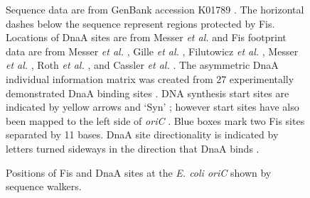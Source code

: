 \documentclass[doublespacing]{narfront}
\begin{document}
\begin{figure}[ht]
\caption{Positions of Fis and DnaA sites at the \emph{E. coli oriC}
shown by sequence walkers.}
Sequence data are from GenBank accession K01789
\cite{Messer.Schaller1979}.
The horizontal dashes below the sequence
represent regions protected by Fis.
Locations of DnaA sites are from
Messer \emph{et al.}
\cite{Messer1991}
and Fis footprint data are from
Messer \emph{et al.} \cite{Messer1991},
Gille \emph{et al.} \cite{Gille1991},
Filutowicz \emph{et al.} \cite{Filutowicz1992},
Messer \emph{et al.} \cite{Messer1992},
Roth \emph{et al.} \cite{Roth1994},
and
Cassler \emph{et al.} \cite{Cassler.Leonard1999}.
The asymmetric
DnaA individual information matrix was created from 27 experimentally
demonstrated DnaA binding sites
\cite{Schneider.baseflip.2001}.
DNA synthesis start sites are indicated by yellow arrows and `Syn'
\cite{Seufert.Messer1987};
however start sites 
have also been mapped to the left side of \emph{oriC}
\cite{Fang.O'Donnell1999}.
Blue boxes mark two Fis sites separated by 11 bases.
DnaA site directionality is indicated by letters turned
sideways in the direction that
DnaA binds \cite{Schneider.walker}.
\label{fig.oriC}
\end{figure} %
\end{document}
